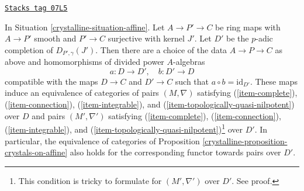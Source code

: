 \begin{lemma}
\label{crystalline-lemma-crystals-on-affine-smooth}
\href{https://stacks.math.columbia.edu/tag/07L5}{\texttt{Stacks tag 07L5}}

In Situation \ref{crystalline-situation-affine}.
Let $A \to P' \to C$ be ring maps with $A \to P'$ smooth and $P' \to C$
surjective with kernel $J'$. Let $D'$ be the $p$-adic completion of
$D_{P', \gamma}(J')$. Then there are a choice of the data $A \to P \to C$
as above and homomorphisms of divided power $A$-algebras
$$
a : D \longrightarrow D',\quad b : D' \longrightarrow D
$$
compatible with the maps $D \to C$ and $D' \to C$ such that
$a \circ b = \text{id}_{D'}$. These maps induce
an equivalence of categories of pairs $(M, \nabla)$ satisfying
(\ref{item-complete}), (\ref{item-connection}),
(\ref{item-integrable}), and (\ref{item-topologically-quasi-nilpotent})
over $D$ and pairs $(M', \nabla')$  satisfying
(\ref{item-complete}), (\ref{item-connection}),
(\ref{item-integrable}), and
(\ref{item-topologically-quasi-nilpotent})\footnote{This condition
is tricky to formulate for $(M', \nabla')$ over $D'$. See proof.} over $D'$.
In particular, the equivalence of categories of
Proposition \ref{crystalline-proposition-crystals-on-affine}
also holds for the corresponding functor towards pairs over $D'$.
\end{lemma}

